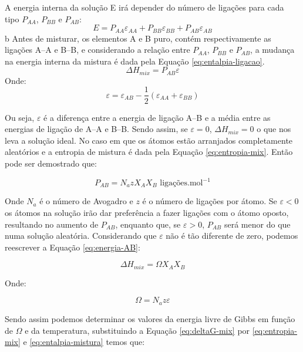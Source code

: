 A energia interna da solução E irá depender do número de ligações para cada tipo $P_{AA}$, $P_{BB}$ e $P_{AB}$: 
\begin{equation} 
E = P_{AA}\varepsilon_{AA} +  P_{BB}\varepsilon_{BB} + P_{AB}\varepsilon_{AB}
\label{eq:energia-interna-solucao}
\end{equation}
b
Antes de misturar, os elementos A e B puro, contém respectivamente as ligações A--A e B--B, e considerando a relação entre $P_{AA}$, $P_{BB}$ e $P_{AB}$, a mudança na energia interna da mistura é dada pela Equação \ref{eq:entalpia-ligacao}.
\begin{equation} 
\Delta H_{mix} = P_{AB} \varepsilon
\label{eq:entalpia-ligacao}
\end{equation}
Onde:
\begin{equation} 
\varepsilon = \varepsilon_{AB} - \frac{1}{2} ( \varepsilon_{AA} + \varepsilon_{BB})
\label{eq:energia-ligacao}
\end{equation}

Ou seja, $\varepsilon$ é a diferença entre a energia de ligação A--B e a média entre as energias de ligação de A--A e B--B. Sendo assim, se $\varepsilon=0$, $\Delta H_{mix}=0$ o que nos leva a solução ideal. No caso em que os átomos estão arranjados completamente aleatórios e a entropia de mistura é dada pela Equação \ref{eq:entropia-mix}. Então pode ser demostrado que:

\begin{equation} 
P_{AB} = N_{a}z X_{A}X_{B} \textrm{  ligações.mol}^{-1} 
\label{eq:energia-AB}
\end{equation}

Onde $N_a$ é o número de Avogadro e $z$ é o número de ligações por átomo. Se $\varepsilon<0$ os átomos na solução irão dar preferência a fazer ligações com o átomo oposto, resultando no aumento de $P_{AB}$, enquanto que, se $\varepsilon>0$, $P_{AB}$ será menor do que numa solução aleatória. Considerando que $\varepsilon$ não é tão diferente de zero, podemos reescrever a Equação \ref{eq:energia-AB}:

\begin{equation} 
\Delta H_{mix} = \Omega X_{A}X_{B}
\label{eq:entalpia-mistura}
\end{equation}

Onde:

\begin{equation} 
\Omega = N_{a}z \varepsilon
\label{eq:omega}
\end{equation}

Sendo assim podemos determinar os valores da energia livre de Gibbs em função de $\Omega$ e da temperatura, substituindo a Equação \ref{eq:deltaG-mix} por  \ref{eq:entropia-mix} e  \ref{eq:entalpia-mistura} temos que:

